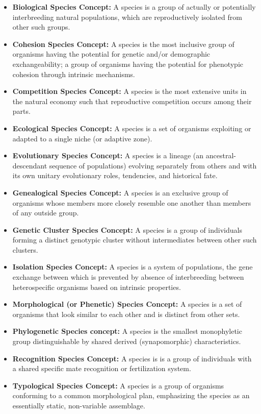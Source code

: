 \documentclass[
]{book}
\begin{document}
\begin{itemize}
\item
  \textbf{Biological Species Concept:} A species is a group of actually or potentially interbreeding natural populations, which are reproductively isolated from other such groups.
\item
  \textbf{Cohesion Species Concept:} A species is the most inclusive group of organisms having the potential for genetic and/or demographic exchangeability; a group of organisms having the potential for phenotypic cohesion through intrinsic mechanisms.
\item
  \textbf{Competition Species Concept:} A species is the most extensive units in the natural economy such that reproductive competition occurs among their parts.
\item
  \textbf{Ecological Species Concept:} A species is a set of organisms exploiting or adapted to a single niche (or adaptive zone).
\item
  \textbf{Evolutionary Species Concept:} A species is a lineage (an ancestral-descendant sequence of populations) evolving separately from others and with its own unitary evolutionary roles, tendencies, and historical fate.
\item
  \textbf{Genealogical Species Concept:} A species is an exclusive group of organisms whose members more closely resemble one another than members of any outside group.
\item
  \textbf{Genetic Cluster Species Concept:} A species is a group of individuals forming a distinct genotypic cluster without intermediates between other such clusters.
\item
  \textbf{Isolation Species Concept:} A species is a system of populations, the gene exchange between which is prevented by absence of interbreeding between heterospecific organisms based on intrinsic properties.
\item
  \textbf{Morphological (or Phenetic) Species Concept:} A species is a set of organisms that look similar to each other and is distinct from other sets.
\item
  \textbf{Phylogenetic Species concept:} A species is the smallest monophyletic group distinguishable by shared derived (synapomorphic) characteristics.
\item
  \textbf{Recognition Species Concept:} A species is is a group of individuals with a shared specific mate recognition or fertilization system.
\item
  \textbf{Typological Species Concept:} A species is a group of organisms conforming to a common morphological plan, emphasizing the species as an essentially static, non-variable assemblage.
\end{itemize}
\end{document}
